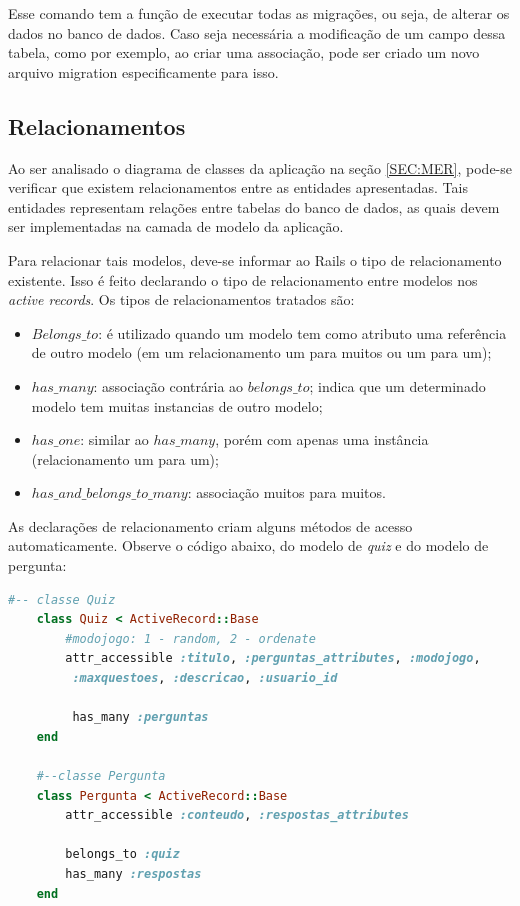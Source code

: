     Esse comando tem a função de executar todas as migrações, ou seja, de alterar os dados no banco de dados. Caso seja necessária a modificação de um campo dessa tabela, como por exemplo, ao criar uma associação, pode ser criado um novo arquivo migration especificamente para isso.
	
    \subsection{Relacionamentos}
     
            Ao ser analisado o diagrama de classes da aplicação na seção \ref{SEC:MER}, pode-se verificar que existem relacionamentos entre as entidades apresentadas. Tais entidades representam relações entre tabelas do banco de dados, as quais devem ser implementadas na camada de modelo da aplicação.
			
            Para relacionar tais modelos, deve-se informar ao Rails o tipo de relacionamento existente. Isso é feito declarando o tipo de relacionamento entre modelos nos \emph{active records}. Os tipos de relacionamentos tratados são:
			
\begin{itemize}
\item $Belongs\_to$: é utilizado quando um modelo tem como atributo uma referência de outro modelo (em um relacionamento um para muitos ou um para um);
\item $has\_many$: associação contrária ao $belongs\_to$; indica que um determinado modelo tem muitas instancias de outro modelo;
\item $has\_one$: similar ao $has\_many$, porém com apenas uma instância (relacionamento um para um);
\item $has\_and\_belongs\_to\_many$: associação muitos para muitos.
\end{itemize}     

    As declarações de relacionamento criam alguns métodos de acesso automaticamente. Observe o código abaixo, do modelo de \emph{quiz} e do modelo de pergunta:
	
\begin{lstlisting}[language=Ruby]
    #-- classe Quiz
    class Quiz < ActiveRecord::Base
      	#modojogo: 1 - random, 2 - ordenate
    	attr_accessible :titulo, :perguntas_attributes, :modojogo,
		 :maxquestoes, :descricao, :usuario_id
     
    	 has_many :perguntas
    end
     
    #--classe Pergunta
    class Pergunta < ActiveRecord::Base
    	attr_accessible :conteudo, :respostas_attributes
     
    	belongs_to :quiz
    	has_many :respostas
    end
	
\end{lstlisting}

